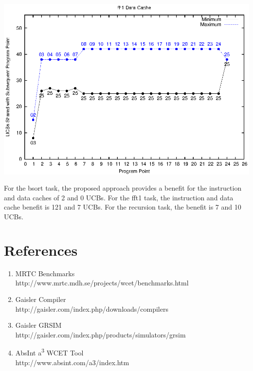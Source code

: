 \begin{center}
  \includegraphics[width=\linewidth]{eps/fft1-dcache.eps}
\end{center}

For the bsort task, the proposed approach provides a benefit for the
instruction and data caches of 2 and 0 UCBs. For the fft1 task, the
instruction and data cache benefit is 121 and 7 UCBs. For the
recursion task, the benefit is 7 and 10 UCBs.

\section{References}

\begin{enumerate}
\item MRTC Benchmarks \\
http://www.mrtc.mdh.se/projects/wcet/benchmarks.html

\item Gaisler Compiler  \\
http://gaisler.com/index.php/downloads/compilers

\item Gaisler GRSIM \\
http://gaisler.com/index.php/products/simulators/grsim

\item AbsInt a\textsuperscript{3} WCET Tool \\
http://www.absint.com/a3/index.htm
\end{enumerate}




